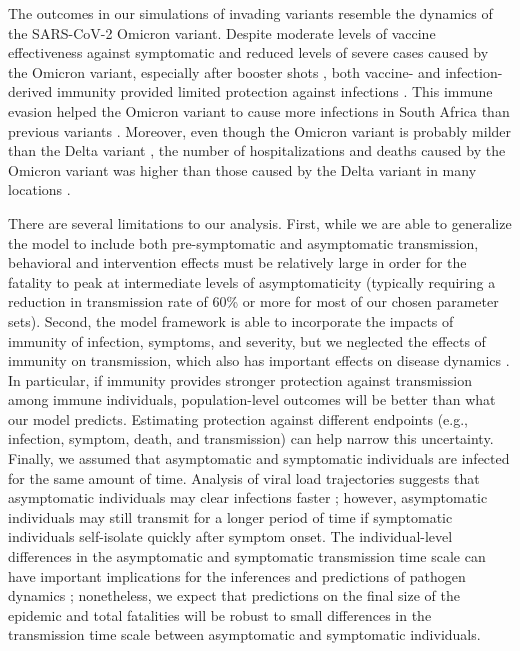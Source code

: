 \documentclass[12pt]{article}
\begin{document}
The outcomes in our simulations of invading variants resemble the dynamics of the SARS-CoV-2 Omicron variant.
Despite moderate levels of vaccine effectiveness against symptomatic and reduced levels of severe cases caused by the Omicron variant, especially after booster shots \citep{andres2022omicron}, both vaccine- and infection-derived immunity provided limited protection against infections \citep{pearson2021omicron}.
This immune evasion helped the Omicron variant to cause more infections in South Africa than previous variants \citep{sun2022omicron}.
Moreover, even though the Omicron variant is probably milder than the Delta variant \citep{MENNI20221618,ulloa2022estimates}, the number of hospitalizations and deaths caused by the Omicron variant was higher than those caused by the Delta variant in many locations \citep{Iacobuccio254,faust2022omicron,sigal2022estimating}.

There are several limitations to our analysis.
First, while we are able to generalize the model to include both pre-symptomatic and asymptomatic transmission, behavioral and intervention effects must be relatively large in order for the fatality to peak at intermediate levels of asymptomaticity (typically requiring a reduction in transmission rate of 60\% or more for most of our chosen parameter sets).
Second, the model framework is able to incorporate the impacts of immunity of infection, symptoms, and severity,
but we neglected the effects of immunity on transmission, which also has important effects on disease dynamics \citep{saad2020immune}.
In particular, if immunity provides stronger protection against transmission among immune individuals, population-level outcomes will be better than what our model predicts.
Estimating protection against different endpoints (e.g., infection, symptom, death, and transmission) can help narrow this uncertainty.
Finally, we assumed that asymptomatic and symptomatic individuals are infected for the same amount of time.
Analysis of viral load trajectories suggests that asymptomatic individuals may clear infections faster \citep{Kissler2020};
however, asymptomatic individuals may still transmit for a longer period of time if symptomatic individuals self-isolate quickly after symptom onset.
The individual-level differences in the asymptomatic and symptomatic transmission time scale can have important implications for the inferences and predictions of pathogen dynamics \citep{park2020time,harris2022time};
nonetheless, we expect that predictions on the final size of the epidemic and total fatalities will be robust to small differences in the transmission time scale between asymptomatic and symptomatic individuals.
\end{document}
